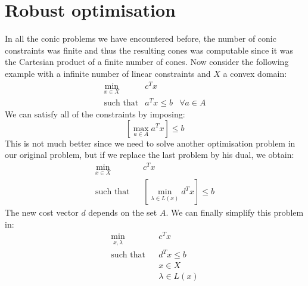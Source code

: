 \section{Robust optimisation}

In all the conic problems we have encountered before, the number of conic constraints was finite and thus the resulting cones was computable since it was the Cartesian product of a finite number of cones. Now consider the following example with a infinite number of linear constraints and $X$ a convex domain:
\begin{eqnarray*}
\min_{x\in X} & c^Tx\\
\text{such that}  & a^Tx \leq b & \forall a\in A
\end{eqnarray*}
We can satisfy all of the constraints by imposing:
$$ \left[\max_{a \in A} a^Tx \right] \leq b $$
This is not much better since we need to solve another optimisation problem in our original problem, but if we replace the last problem by his dual, we obtain:
\begin{eqnarray*}
\min_{x\in X} & & c^Tx\\
\text{such that} & & \left[\min_{\lambda \in L(x)} d^Tx \right] \leq b 
\end{eqnarray*}
The new cost vector $d$ depends on the set $A$. We can finally simplify this problem in:
\begin{eqnarray*}
\min_{x,\lambda} & & c^Tx \\
\text{such that}  & & d^Tx \leq b \\
& & x\in X \\
& & \lambda\in L(x)
\end{eqnarray*}

